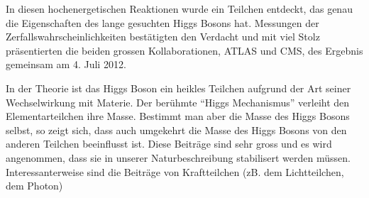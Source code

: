 \documentclass[11pt,a4paper]{article}
\begin{document}

In diesen hochenergetischen Reaktionen wurde ein Teilchen entdeckt, das genau die Eigenschaften des lange gesuchten Higgs Bosons hat.
Messungen der Zerfallswahrscheinlichkeiten best\"atigten den Verdacht und mit viel Stolz pr\"asentierten die beiden grossen Kollaborationen, ATLAS und CMS,
des Ergebnis gemeinsam am 4. Juli 2012.

In der Theorie ist das Higgs Boson ein heikles Teilchen aufgrund der Art seiner Wechselwirkung mit Materie.
Der ber\"uhmte ``Higgs Mechanismus'' verleiht den Elementarteilchen ihre Masse. Bestimmt man aber die Masse des Higgs Bosons selbst,
so zeigt sich, dass auch umgekehrt die Masse des Higgs Bosons von den anderen Teilchen beeinflusst ist. Diese Beitr\"age sind sehr gross und
es wird angenommen, dass sie in unserer Naturbeschreibung stabilisert werden m\"ussen. Interessanterweise sind die Beitr\"age von Kraftteilchen (zB. dem Lichtteilchen, dem Photon)
\end{document}
